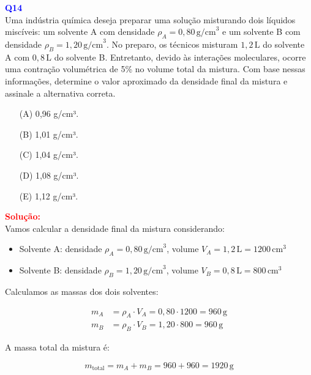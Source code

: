 \documentclass[a4paper,12pt]{article}
\begin{document}
\begin{flushleft}
\textbf{\textcolor{blue}{\Large Q14}}\\

Uma indústria química deseja preparar uma solução misturando dois líquidos miscíveis: um solvente A 
com densidade \( \rho_A = 0{,}80\,\text{g/cm}^3 \) e um solvente B com densidade \( \rho_B = 1{,}20\,\text{g/cm}^3 \).
No preparo, os técnicos misturam \(1{,}2\,\text{L}\) do solvente A com \(0{,}8\,\text{L}\) do solvente B. 
Entretanto, devido às interações moleculares, ocorre uma contração volumétrica de 5\% no volume total da mistura.
Com base nessas informações, determine o valor aproximado da densidade final da mistura e assinale a alternativa correta.


\begin{itemize}
\item[(A)] 0{,}96 g/cm³.
\item[(B)] 1,01 g/cm³.
\item[(C)] 1,04 g/cm³.
\item[(D)] 1,08 g/cm³.
\item[(E)] 1,12 g/cm³.
\end{itemize}

\vspace{0.5cm}

\textcolor{red}{\textbf{Solução:}}\\

\noindent
Vamos calcular a densidade final da mistura considerando:

\begin{itemize}
  \item Solvente A: densidade \( \rho_A = 0{,}80\,\text{g/cm}^3 \), volume \( V_A = 1{,}2\,\text{L} = 1200\,\text{cm}^3 \)
  \item Solvente B: densidade \( \rho_B = 1{,}20\,\text{g/cm}^3 \), volume \( V_B = 0{,}8\,\text{L} = 800\,\text{cm}^3 \)
\end{itemize}

\noindent
Calculamos as massas dos dois solventes:

\begin{align*}
m_A &= \rho_A \cdot V_A = 0{,}80 \cdot 1200 = 960\,\text{g} \\
m_B &= \rho_B \cdot V_B = 1{,}20 \cdot 800 = 960\,\text{g}
\end{align*}

\noindent
A massa total da mistura é:

\[
m_{\text{total}} = m_A + m_B = 960 + 960 = 1920\,\text{g}
\]


\end{flushleft}
\end{document}
